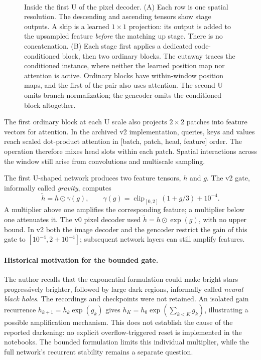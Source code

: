 \begin{figure}[t]
 \centering
 \resizebox{.98\textwidth}{!}{}\\[5pt]
 \resizebox{.98\textwidth}{!}{}
 \caption{Inside the first U of the pixel decoder. (A) Each row is one spatial resolution. The descending and ascending tensors show stage outputs. A skip is a learned $1\times1$ projection: its output is added to the upsampled feature \emph{before} the matching up stage. There is no concatenation. (B) Each stage first applies a dedicated code-conditioned block, then two ordinary blocks. The cutaway traces the conditioned instance, where neither the learned position map nor attention is active. Ordinary blocks have within-window position maps, and the first of the pair also uses attention. The second U omits branch normalization; the gencoder omits the conditioned block altogether.}
 \label{fig:notebook-block}
\end{figure}

The first ordinary block at each U scale also projects $2\times2$ patches into feature vectors for attention. In the archived v2 implementation, queries, keys and values reach scaled dot-product attention in [batch, patch, head, feature] order. The operation therefore mixes head slots within each patch. Spatial interactions across the window still arise from convolutions and multiscale sampling.

The first U-shaped network produces two feature tensors, $h$ and $g$. The v2 gate, informally called \emph{gravity}, computes
\begin{equation}
  \widetilde h=h\odot\gamma(g),\qquad
  \gamma(g)=\operatorname{clip}_{[0,2]}(1+g/3)+10^{-4}.
  \label{eq:regae-gravity}
\end{equation}
A multiplier above one amplifies the corresponding feature; a multiplier below one attenuates it. The v0 pixel decoder used $\widetilde h=h\odot\exp(g)$, with no upper bound. In v2 both the image decoder and the gencoder restrict the gain of this gate to $[10^{-4},2+10^{-4}]$; subsequent network layers can still amplify features.

\paragraph{Historical motivation for the bounded gate.}
The author recalls that the exponential formulation could make bright stars progressively brighter, followed by large dark regions, informally called \emph{neural black holes}. The recordings and checkpoints were not retained. An isolated gain recurrence $h_{k+1}=h_k\exp(g_k)$ gives $h_K=h_0\exp(\sum_{k<K}g_k)$, illustrating a possible amplification mechanism. This does not establish the cause of the reported darkening: no explicit overflow-triggered reset is implemented in the notebooks. The bounded formulation limits this individual multiplier, while the full network's recurrent stability remains a separate question.

